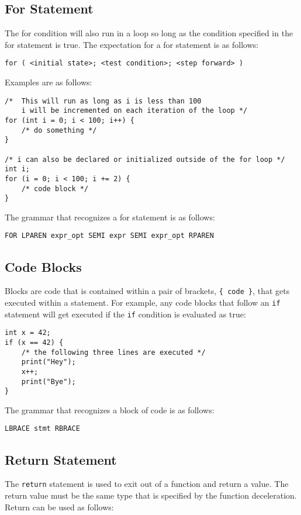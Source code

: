 \documentclass{article}
\begin{document}
\subsection{For Statement}
The for condition will also run in a loop so long as the condition specified in the for statement is true.  The expectation for a for statement is as follows:

\texttt{for ( <initial state>; <test condition>; <step forward> )}

Examples are as follows:

\begin{lstlisting}
/* 	This will run as long as i is less than 100
	i will be incremented on each iteration of the loop */
for (int i = 0; i < 100; i++) {
	/* do something */
}

/* i can also be declared or initialized outside of the for loop */
int i;
for (i = 0; i < 100; i += 2) {
	/* code block */
}
\end{lstlisting}

The grammar that recognizes a for statement is as follows:
\begin{Verbatim}[frame=single]
FOR LPAREN expr_opt SEMI expr SEMI expr_opt RPAREN
\end{Verbatim}

\subsection{Code Blocks}
Blocks are code that is contained within a pair of brackets, \texttt{\{ code \}}, that gets executed within a statement.  For example, any code blocks that follow an \texttt{if} statement will get executed if the \texttt{if} condition is evaluated as true:

\begin{lstlisting}
int x = 42;
if (x == 42) {
	/* the following three lines are executed */
	print("Hey");
	x++;
	print("Bye");
}
\end{lstlisting}

The grammar that recognizes a block of code is as follows:
\begin{Verbatim}[frame=single]
LBRACE stmt RBRACE
\end{Verbatim}

\subsection{Return Statement}
The \texttt{return} statement is used to exit out of a function and return a value.  The return value must be the same type that is specified by the function deceleration.  Return can be used as follows:
\end{document}
